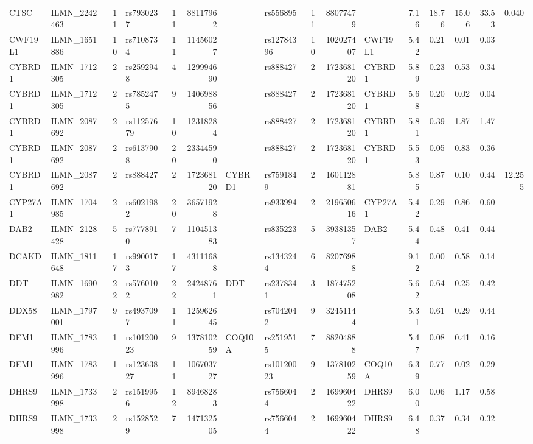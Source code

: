 \documentclass{article}
\begin{document}
\begin{landscape}
{\begin{ThreePartTable}
\begin{longtable}{|llr|lrrl|lrrl|rrrr|r|}
  CTSC & ILMN\_2242463 & 11 & rs7930237 & 11 & 88117962 &  & rs556895 & 11 & 88077479 &  & 7.16 & 18.76 & 15.06 & 33.53 & 0.040 \\
  CWF19L1 & ILMN\_1651886 & 10 & rs7108734 & 11 & 11456027 &  & rs12784396 & 10 & 102027407 & CWF19L1 & 5.42 & 0.21 & 0.01 & 0.03 &  \\
  CYBRD1 & ILMN\_1712305 & 2 & rs2592948 & 4 & 129994690 &  & rs888427 & 2 & 172368120 & CYBRD1 & 5.89 & 0.23 & 0.53 & 0.34 &  \\
  CYBRD1 & ILMN\_1712305 & 2 & rs7852475 & 9 & 140698856 &  & rs888427 & 2 & 172368120 & CYBRD1 & 5.68 & 0.20 & 0.02 & 0.04 &  \\
  CYBRD1 & ILMN\_2087692 & 2 & rs11257679 & 10 & 12318284 &  & rs888427 & 2 & 172368120 & CYBRD1 & 5.81 & 0.39 & 1.87 & 1.47 &  \\
  CYBRD1 & ILMN\_2087692 & 2 & rs6137908 & 20 & 23344590 &  & rs888427 & 2 & 172368120 & CYBRD1 & 5.53 & 0.05 & 0.83 & 0.36 &  \\
  CYBRD1 & ILMN\_2087692 & 2 & rs888427 & 2 & 172368120 & CYBRD1 & rs7591849 & 2 & 160112881 &  & 5.85 & 0.87 & 0.10 & 0.44 & 12.255 \\
  CYP27A1 & ILMN\_1704985 & 2 & rs6021982 & 20 & 36571928 &  & rs933994 & 2 & 219650616 & CYP27A1 & 5.42 & 0.29 & 0.86 & 0.60 &  \\
  DAB2 & ILMN\_2128428 & 5 & rs7778910 & 7 & 110451383 &  & rs835223 & 5 & 39381357 & DAB2 & 5.44 & 0.48 & 0.41 & 0.44 &  \\
  DCAKD & ILMN\_1811648 & 17 & rs9900173 & 17 & 43111688 &  & rs1343244 & 6 & 82076988 &  & 9.12 & 0.00 & 0.58 & 0.14 &  \\
  DDT & ILMN\_1690982 & 22 & rs5760102 & 22 & 24248761 & DDT & rs2378341 & 3 & 187475208 &  & 5.62 & 0.64 & 0.25 & 0.42 &  \\
  DDX58 & ILMN\_1797001 & 9 & rs4937097 & 11 & 125962645 &  & rs7042042 & 9 & 32451144 &  & 5.31 & 0.61 & 0.29 & 0.44 &  \\
  DEM1 & ILMN\_1783996 & 1 & rs10120023 & 9 & 137810259 & COQ10A & rs2519515 & 7 & 88204888 &  & 5.47 & 0.08 & 0.41 & 0.16 &  \\
  DEM1 & ILMN\_1783996 & 1 & rs12363827 & 11 & 106703727 &  & rs10120023 & 9 & 137810259 & COQ10A & 6.39 & 0.77 & 0.02 & 0.29 &  \\
  DHRS9 & ILMN\_1733998 & 2 & rs1519956 & 12 & 89468283 &  & rs7566044 & 2 & 169960422 & DHRS9 & 6.00 & 0.06 & 1.17 & 0.58 &  \\
  DHRS9 & ILMN\_1733998 & 2 & rs1528529 & 7 & 147132505 &  & rs7566044 & 2 & 169960422 & DHRS9 & 6.48 & 0.37 & 0.34 & 0.32 &  \\

\end{longtable}
\end{ThreePartTable}}
\end{landscape}
\end{document}
